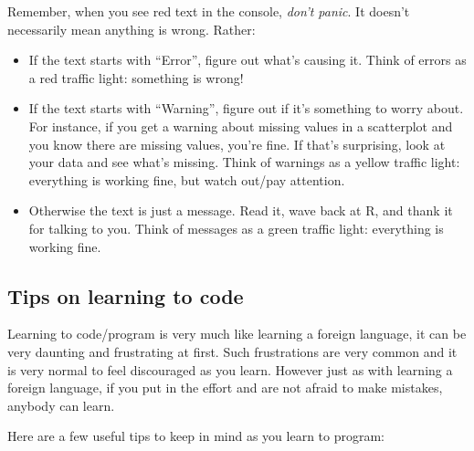 \documentclass[
  letterpaper,
  DIV=11,
  numbers=noendperiod]{scrreprt}
\theoremstyle{definition}
\theoremstyle{remark}
\begin{document}
Remember, when you see red text in the console, \emph{don't panic}. It
doesn't necessarily mean anything is wrong. Rather:

\begin{itemize}
\item
  If the text starts with ``Error'', figure out what's causing it.
  {Think of errors as a red traffic light: something is wrong!}
\item
  If the text starts with ``Warning'', figure out if it's something to
  worry about. For instance, if you get a warning about missing values
  in a scatterplot and you know there are missing values, you're fine.
  If that's surprising, look at your data and see what's missing. {Think
  of warnings as a yellow traffic light: everything is working fine, but
  watch out/pay attention.}
\item
  Otherwise the text is just a message. Read it, wave back at R, and
  thank it for talking to you. {Think of messages as a green traffic
  light: everything is working fine.}
\end{itemize}

\hypertarget{tips-on-learning-to-code}{%
\subsection{Tips on learning to code}\label{tips-on-learning-to-code}}

Learning to code/program is very much like learning a foreign language,
it can be very daunting and frustrating at first. Such frustrations are
very common and it is very normal to feel discouraged as you learn.
However just as with learning a foreign language, if you put in the
effort and are not afraid to make mistakes, anybody can learn.

Here are a few useful tips to keep in mind as you learn to program:
\end{document}
